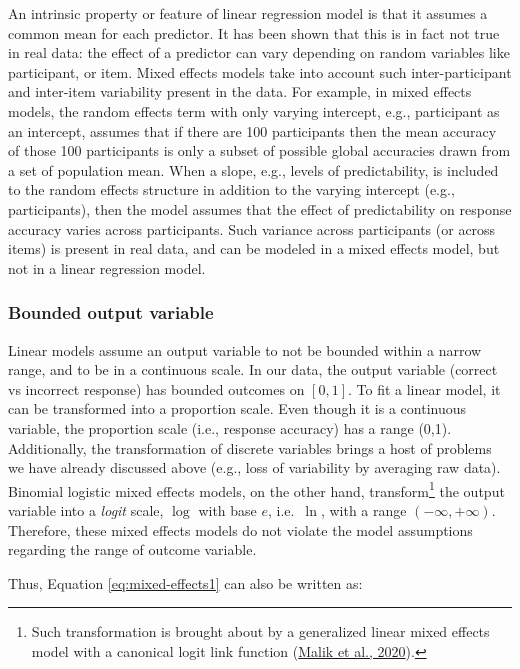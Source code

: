 \documentclass[a4paper, nobind]{templates/ociamthesis}
\begin{document}
An intrinsic property or feature of linear regression model is that it assumes a common mean for each predictor.
It has been shown that this is in fact not true in real data:
the effect of a predictor can vary depending on random variables like participant, or item.
Mixed effects models take into account such inter-participant and inter-item variability present in the data.
For example, in mixed effects models,
the random effects term with only varying intercept, e.g., participant as an intercept, assumes that if there are 100 participants then the mean accuracy of those 100 participants is only a subset of possible global accuracies drawn from a set of population mean.
When a slope, e.g., levels of predictability, is included to the random effects structure in addition to the varying intercept (e.g., participants), then the model assumes that the effect of predictability on response accuracy varies across participants.
Such variance across participants (or across items) is present in real data,
and can be modeled in a mixed effects model, but not in a linear regression model.

\hypertarget{bounded-output-variable}{%
\subsubsection{Bounded output variable}\label{bounded-output-variable}}

Linear models assume an output variable to not be bounded within a narrow range, and to be in a continuous scale.
In our data, the output variable (correct vs incorrect response) has bounded outcomes on \([0,1]\).
To fit a linear model, it can be transformed into a proportion scale.
Even though it is a continuous variable, the proportion scale (i.e., response accuracy) has a range (0,1).
Additionally, the transformation of discrete variables brings a host of problems we have already discussed above (e.g., loss of variability by averaging raw data).
Binomial logistic mixed effects models, on the other hand, transform\footnote{Such transformation is brought about by a generalized linear mixed effects model with a canonical logit link function (\protect\hyperlink{ref-Malik2020}{Malik et al., 2020}).} the output variable into a \emph{logit} scale, \(\log\) with base \(e\), i.e.~\(\ln\), with a range \((-\infty, +\infty)\).
Therefore, these mixed effects models do not violate the model assumptions regarding the range of outcome variable.

Thus, Equation \eqref{eq:mixed-effects1} can also be written as:
\end{document}
